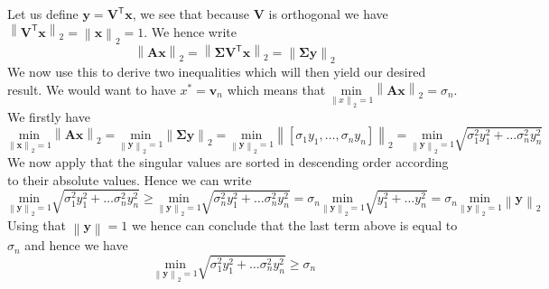 \documentclass{article}
\begin{document}
\noindent Let us define $\mathbf{y} = \mathbf{V}^{\mathsf{T}}\mathbf{x}$, we see that because $\mathbf{V}$ is orthogonal we have $\left\lVert \mathbf{V}^{\mathsf{T}}\mathbf{x}\right\rVert_{2} =\left\lVert \mathbf{x}\right\rVert_{2} =1$. We hence write
\begin{equation*}
     \left\lVert \mathbf{A}\mathbf{x}\right\rVert_{2} =  \left\lVert \mathbf{\Sigma}\mathbf{V}^{\mathsf{T}}\mathbf{x}\right\rVert_{2}  =  \left\lVert \mathbf{\Sigma}\mathbf{y}\right\rVert_{2} 
\end{equation*}
We now use this to derive two inequalities which will then yield our desired result. We would want to have $x^{*} = \mathbf{v}_{n}$ which means that $\underset{\left\lVert x\right\rVert_{2} = 1}{\text{min}}\left\lVert \mathbf{A}\mathbf{x}\right\rVert_{2} = \sigma_{n}$. We firstly have
\begin{equation*}
    \underset{\left\lVert \mathbf{x}\right\rVert_{2} = 1}{\text{min}}\left\lVert \mathbf{A}\mathbf{x}\right\rVert_{2} = \underset{\left\lVert \mathbf{y}\right\rVert_{2} = 1}{\text{min}}\left\lVert \mathbf{\Sigma}\mathbf{y}\right\rVert_{2} = \underset{\left\lVert \mathbf{y}\right\rVert_{2} = 1}{\text{min}}\left\lVert \left[\sigma_{1}y_{1}, \dots, \sigma_{n}y_{n}\right]\right\rVert_{2} 
    = \underset{\left\lVert \mathbf{y}\right\rVert_{2} = 1}{\text{min}}\sqrt{\sigma_{1}^{2}y_{1}^{2} + \dots \sigma_{n}^{2}y_{n}^{2}}
\end{equation*}
We now apply that the singular values are sorted in descending order according to their absolute values. Hence we can write
\begin{equation*}
    \underset{\left\lVert \mathbf{y}\right\rVert_{2} = 1}{\text{min}}\sqrt{\sigma_{1}^{2}y_{1}^{2} + \dots \sigma_{n}^{2}y_{n}^{2}} \geq  \underset{\left\lVert \mathbf{y}\right\rVert_{2} = 1}{\text{min}}\sqrt{\sigma_{n}^{2}y_{1}^{2} + \dots \sigma_{n}^{2}y_{n}^{2}} = \sigma_{n}\underset{\left\lVert \mathbf{y}\right\rVert_{2} = 1}{\text{min}}\sqrt{y_{1}^{2} + \dots y_{n}^{2}} = \sigma_{n} \underset{\left\lVert \mathbf{y}\right\rVert_{2} = 1}{\text{min}} \left\lVert \mathbf{y}\right\rVert_{2}
\end{equation*}
Using that $\left\lVert \mathbf{y}\right\rVert = 1$ we hence can conclude that the last term above is equal to $\sigma_{n}$ and hence we have 
 \begin{equation*}
     \underset{\left\lVert \mathbf{y}\right\rVert_{2} = 1}{\text{min}}\sqrt{\sigma_{1}^{2}y_{1}^{2} + \dots \sigma_{n}^{2}y_{n}^{2}} \geq \sigma_{n}
 \end{equation*}
\end{document}
